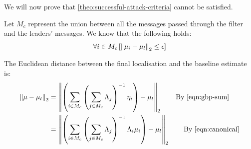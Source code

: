We will now prove that \ref{theo:successful-attack-criteria} cannot be satisfied.

Let $M_c$ represent the union between all the messages passed through the filter and the leaders' messages. We know that the following holds:
\begin{equation}
    \forall i \in M_c \left[ \left\lVert\mu_i - \mu_l\right\rVert_2 \leq \epsilon\right] \label{eqn:all_smaller}
\end{equation}

The Euclidean distance between the final localisation and the baseline estimate is:
\begin{align}
    \norm{\mu - \mu_l} &= \norm{\left(\sum_{i \in M_c} \left(\sum_{j \in M_c} \Lambda_j\right)^{-1} \eta_i\right)  - \mu_l} \tag*{\text{By \ref{eqn:gbp-sum}}}\\
    &= \norm{\left(\sum_{i \in M_c} \left(\sum_{j \in M_c} \Lambda_j\right)^{-1} \Lambda_i\mu_i\right)  - \mu_l} \tag*{\text{By \ref{eqn:canonical}}}
\end{align}

